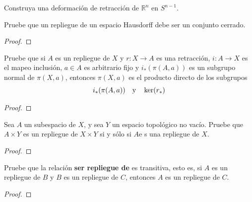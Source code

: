 \documentclass[12pt]{report}
\theoremstyle{largebreak}
\newcommand\cf[3]{\ensuremath{#1:#2\rightarrow#3}}
\begin{document}
    \begin{excer}
        Construya una deformación de retracción de $\mathbb{R}^n$ en $S^{ n-1}$.
    \end{excer}

    \begin{sol}
        
    \end{sol}

    \begin{excer}
        Pruebe que un repliegue de un espacio Hausdorff debe ser un conjunto cerrado.
    \end{excer}

    \begin{proof}
        
    \end{proof}

    \begin{excer}
        Pruebe que si $A$ es un repliegue de $X$ y $\cf{r}{X}{A}$ es una retracción, $\cf{i}{A}{X}$ es el mapeo inclusión, $a\in A$ es arbitrario fijo y $i_*(\pi(A,a))$ es un subgrupo normal de $\pi(X,a)$, entonces $\pi(X,a)$ es el producto directo de los subgrupos
        \begin{equation*}
            i_*(\pi(A,a))\quad\textup{y}\quad \ker(r_*)
        \end{equation*}
    \end{excer}

    \begin{proof}
        
    \end{proof}

    \begin{excer}
        Sea $A$ un subespacio de $X$, y sea $Y$ un espacio topológico no vacío. Pruebe que $A\times Y$ es un repliegue de $X\times Y$ si y sólo si $A$e s una repliegue de $X$.
    \end{excer}

    \begin{proof}
        
    \end{proof}

    \begin{excer}
        Pruebe que la relación \textbf{ser repliegue de} es transitiva, esto es, si $A$ es un repliegue de $B$ y $B$ es un repliegue de $C$, entonces $A$ es un repliegue de $C$.
    \end{excer}

    \begin{proof}
        
    \end{proof}
\end{document}
